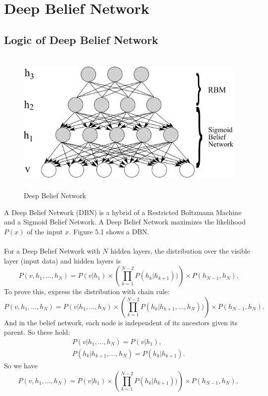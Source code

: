 \documentclass[12pt]{article}
\begin{document}
\section{Deep Belief Network}
\subsection{Logic of Deep Belief Network}
\begin{figure}[h]
\centering
\includegraphics[height=2.8in]{DBN.png}
\caption{Deep Belief Network} \label{fig:side:a}
\end{figure}
A Deep Belief Network (DBN) is a hybrid of a Restricted Boltzmann Machine and a Sigmoid Belief Network. A Deep Belief Network maximizes the likelihood $P(x)$ of the input $x$. Figure 5.1 shows a DBN.\\
\\
For a Deep Belief Network with $N$ hidden layers, the distribution over the visible layer (input data) and hidden layers is\begin{equation}
P(v, h_1, ..., h_N)  = P(v| h_1) \times\left(\prod_{k=1}^{N-2}  P(h_k| h_{k+1}))\right)\times P(h_{N-1},h_N).
\end{equation}
To prove this, express the distribution with chain rule:\begin{equation}
P(v, h_1, ..., h_N)  = P(v| h_1, ..., h_N) \times\left(\prod_{k=1}^{N-2}  P(h_k| h_{k+1},..., h_{N}))\right)\times P(h_{N-1},h_N).
\end{equation}
And in the belief network, each node is independent of its ancestors given its parent. So these hold:\begin{gather}
P(v| h_1, ..., h_N) = P(v|h_1),\\
P(h_k| h_{k+1},..., h_{N}) = P(h_k| h_{k+1}).
\end{gather}
So we have \begin{equation}
P(v, h_1, ..., h_N)  = P(v| h_1) \times\left(\prod_{k=1}^{N-2}  P(h_k| h_{k+1}))\right)\times P(h_{N-1},h_N),
\end{equation}
\end{document}
